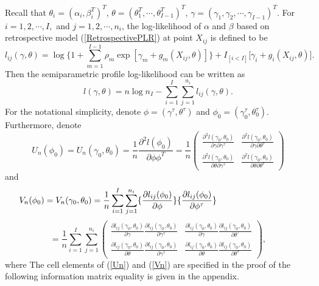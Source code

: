 \documentclass[12]{interact}
\theoremstyle{plain}%
\theoremstyle{definition}
\theoremstyle{remark}
\begin{document}
Recall that $\theta_i=(\alpha_i,\beta_i^T)^T$, $\theta=(\theta_1^T, \cdots, \theta_{I-1}^T)^T$,
$\gamma=(\gamma_1, \gamma_2, \cdots, \gamma_{I-1})^T$. For $i=1, 2, \cdots, I,$ and $j=1, 2, \cdots, n_i$, the
log-likelihood of $\alpha$ and $\beta$ based on retrospective model (\ref{RetrospectivePLR}) at point $X_{ij}$ is defined to be
\begin{equation}
	l_{ij}(\gamma, \theta)=\log \{ 1+\sum_{m=1}^{I-1}\rho_m\exp[\gamma_m+g_m(X_{ij},\theta)]
	\} +I_{[i<I]}\big[ \gamma_i+g_i(X_{ij},\theta)\big].\label{L_ij}
\end{equation}
Then the semiparametric profile log-likelihood can be written as
$$l(\gamma,\theta)=n\log n_I-\sum_{i=1}^I\sum_{j=1}^{n_i}l_{ij}(\gamma,\theta).$$
For the notational simplicity, denote $\phi=(\gamma^\tau, \theta^\tau)$ and $\phi_0=(\gamma_0^\tau, \theta_0^\tau)$.
Furthermore, denote
\begin{equation}
	U_n(\phi_0)=U_n(\gamma_0,
	\theta_0)=\frac{1}{n}\frac{\partial^2l(\phi_0)}{\partial \phi\phi^T} =\frac{1}{n} \left( \begin{array}{cc}
		\frac{\textstyle{\partial^2 l(\gamma_0, \theta_0)}} {\textstyle{\partial \gamma
				\partial \gamma^\tau}}  & \frac{\textstyle{\partial^2 l(\gamma_0, \theta_0)}}
		{\textstyle{\partial \gamma \partial \theta^\tau}} \\
		\frac{\textstyle{\partial^2 l(\gamma_0, \theta_0)}}{\textstyle{\partial \theta
				\partial \gamma^\tau}} & \frac{\textstyle{\partial^2 l(\gamma_0, \theta_0)}}{\textstyle{\partial \theta \partial \theta^\tau}}
	\end{array} \right)\label{Un}
\end{equation}
and
$$V_n(\phi_0)=V_n(\gamma_0,\theta_0)=\frac{1}{n}\sum_{i=1}^I\sum_{j=1}^{n_i}
\{\frac{\partial l_{ij}(\phi_0)}{\partial\phi}\} \{\frac{\partial
	l_{ij}(\phi_0)}{\partial\phi^\tau} \}\hspace{1.3in} $$
\begin{equation}
	= \frac{1}{n} \sum_{i=1}^I\sum_{j=1}^{n_i}\left(
	\begin{array}{cc}\frac{\textstyle{\partial l_{ij}(\gamma_0,\theta_0)}}{\textstyle{\partial
				\gamma}}\frac{\textstyle{\partial
				l_{ij}(\gamma_0,\theta_0)}}{\textstyle{\partial \gamma^\tau}} &
		\frac{\textstyle{\partial
				l_{ij}(\gamma_0,\theta_0)}}{\textstyle{\partial
				\gamma}}\frac{\textstyle{\partial
				l_{ij}(\gamma_0,\theta_0)}}{\textstyle{\partial
				\theta^\tau}} \\
		\frac{\textstyle{\partial
				l_{ij}(\gamma_0,\theta_0)}}{\textstyle{\partial
				\theta}}\frac{\textstyle{\partial
				l_{ij}(\gamma_0,\theta_0)}}{\textstyle{\partial \gamma^\tau}} &
		\frac{\textstyle{\partial
				l_{ij}(\gamma_0,\theta_0)}}{\textstyle{\partial
				\theta}}\frac{\textstyle{\partial
				l_{ij}(\gamma_0,\theta_0)}}{\textstyle{\partial \theta^\tau}}
	\end{array}\right),\label{Vn}
\end{equation}
\noindent where The cell elements of (\ref{Un}) and (\ref{Vn}) are specified in
the proof of the following information matrix equality is given in the appendix.
\end{document}
